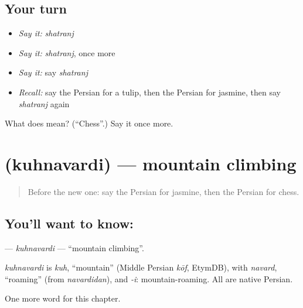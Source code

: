 \subsection*{Your turn}
\begin{itemize}
\raggedright
  \item \emph{Say it:} \emph{shatranj}
  \item \emph{Say it:} \emph{shatranj}, once more
  \item \emph{Say it:} say \emph{shatranj}
  \item \emph{Recall:} say the Persian for a tulip, then the Persian for jasmine, then say \emph{shatranj} again
\end{itemize}

\begin{tcolorbox}[breakable,colback=teal!4,colframe=teal!35!black,title={Before you move on}]
What does  mean? (\textquotedblleft{}Chess\textquotedblright{}.) Say it once more.
\end{tcolorbox}
\section[\texorpdfstring{\fa{کوهنوردی} (kuhnavardi)}{کوهنوردی (kuhnavardi)}]{ (kuhnavardi) — mountain climbing}

\label{lesson:FA-C280-kuhnavardi}



\begin{quote}
Before the new one: say the Persian for jasmine, then the Persian for chess.
\end{quote}

\subsection*{You'll want to know: }
\textbf{} — \emph{kuhnavardi} — \textquotedblleft{}mountain climbing\textquotedblright{}.

\begin{cousinweb}
\emph{kuhnavardi} is \emph{kuh}, \textquotedblleft{}mountain\textquotedblright{} (Middle Persian \emph{kōf}, EtymDB), with \emph{navard}, \textquotedblleft{}roaming\textquotedblright{} (from \emph{navardidan}), and \emph{-i}: mountain-roaming. All are native Persian.
\end{cousinweb}

\begin{grammarlens}[title={What you've built}]
One more word for this chapter.
\end{grammarlens}

